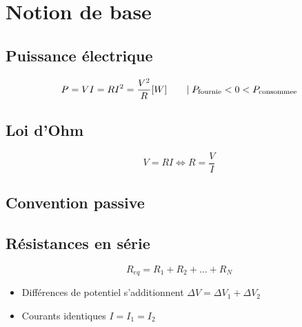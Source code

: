 \section{Notion de base}
\vspace{-1.75\baselineskip}
\subsection{Puissance électrique}
\begin{equation*}
    P = VI = R I^2 = \frac{V^2}{R} \qty[W] \qq{}|\; P_{\mathrm{fournie}} < 0 < P_{\mathrm{consommee}}
\end{equation*}

\begin{multicols*}{2}
\subsection{Loi d'Ohm}
\centering
\begin{equation*}
    V = RI \Leftrightarrow R=\frac{V}{I}
\end{equation*}

\subsection{Convention passive}
\end{multicols*}

\subsection{Résistances en série}
\begin{equation*}
    R_{\mathit{eq}}=R_1 + R_2 + \dots + R_N
\end{equation*}
\begin{itemize}[nosep]
    \item Différences de potentiel s'additionnent \( \Delta V = \Delta V_1 +\Delta V_2 \)
    \item Courants identiques \( I= I_1 = I_2\)
\end{itemize}

